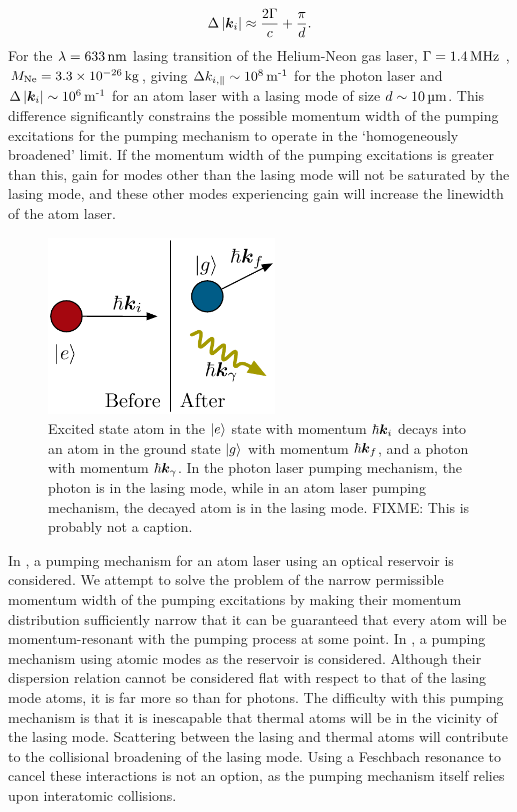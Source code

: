 \begin{align*}
    \Delta \left|\bm{k}_{i}\right| \approx \frac{2 \Gamma}{c} + \frac{\pi}{d}.
\end{align*}
For the $\lambda = \unit[633]{nm}$ lasing transition of the Helium-Neon gas laser, $\Gamma = \unit[1.4]{MHz}$ \citep[Table~13.2-1]{SalehTeich}, $M_\text{Ne} = 3.3 \times \unit[10^{-26}]{kg}$, giving $\Delta k_{i, \parallel} \sim \unit[10^8]{m\textsuperscript{-1}}$ for the photon laser and $\Delta\abs{\vect{k}_i} \sim \unit[10^{6}]{m\textsuperscript{-1}}$ for an atom laser with a lasing mode of size $d \sim \unit[10]{\micro m}$.  This difference significantly constrains the possible momentum width of the pumping excitations for the pumping mechanism to operate in the `homogeneously broadened' limit.  If the momentum width of the pumping excitations is greater than this, gain for modes other than the lasing mode will not be saturated by the lasing mode, and these other modes experiencing gain will increase the linewidth of the atom laser.  

\begin{figure}
    \centering
    \includegraphics[width=6cm]{AtomDecay}
    \caption{
        \label{Introduction:AtomDecay}
        Excited state atom in the ${\left|e\right>}$ state with momentum $\hbar \bm{k}_i$ decays into an atom in the ground state ${\left|g\right>}$ with momentum $\hbar \bm{k}_f$, and a photon with momentum $\hbar \bm{k}_\gamma$.  In the photon laser pumping mechanism, the photon is in the lasing mode, while in an atom laser pumping mechanism, the decayed atom is in the lasing mode.  FIXME: This is probably not a caption.
    }
\end{figure}

In , a pumping mechanism for an atom laser using an optical reservoir is considered.  We attempt to solve the problem of the narrow permissible momentum width of the pumping excitations by making their momentum distribution sufficiently narrow that it can be guaranteed that every atom will be momentum-resonant with the pumping process at some point.  In , a pumping mechanism using atomic modes as the reservoir is considered.  Although their dispersion relation cannot be considered flat with respect to that of the lasing mode atoms, it is far more so than for photons.  The difficulty with this pumping mechanism is that it is inescapable that thermal atoms will be in the vicinity of the lasing mode.  Scattering between the lasing and thermal atoms will contribute to the collisional broadening of the lasing mode.  Using a Feschbach resonance to cancel these interactions is not an option, as the pumping mechanism itself relies upon interatomic collisions.

